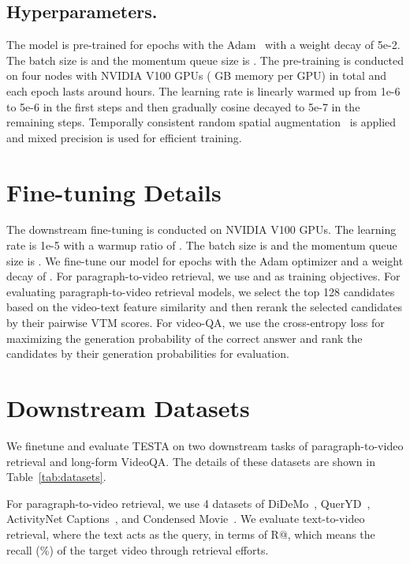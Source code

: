 \documentclass[11pt]{article}
\newcommand{\modelname}{TESTA\xspace}
\begin{document}
\subsection{Hyperparameters.}
The model is pre-trained for  epochs with the Adam~\citep{adam} with a weight decay of 5e-2.
The batch size is  and the momentum queue size is . 
The pre-training is conducted on four nodes with  NVIDIA V100 GPUs ( GB memory per GPU) in total and each epoch lasts around  hours.
The learning rate is linearly warmed up from 1e-6 to 5e-6 in the first  steps and then gradually cosine decayed to 5e-7 in the remaining steps.
Temporally consistent random spatial augmentation~\citep{qian2021spatiotemporal} is applied and mixed precision is used for efficient training.

\section{Fine-tuning Details}
\label{sec:fine-tuning}
The downstream fine-tuning is conducted on  NVIDIA V100 GPUs. The learning rate is 1e-5 with a warmup ratio of . The batch size is  and the momentum queue size is . We fine-tune our model for  epochs with the Adam optimizer and a weight decay of . 
For paragraph-to-video retrieval,  we use  and   as training objectives.  
For evaluating paragraph-to-video retrieval models, we select the top 128 candidates based on the video-text feature similarity and then rerank the selected candidates by their pairwise VTM scores.
For video-QA, we use the cross-entropy loss for maximizing the generation probability of the correct answer and rank the candidates by their generation probabilities for evaluation.

\section{Downstream Datasets}
\label{sec:dataset}
We finetune and evaluate \modelname on two downstream tasks of paragraph-to-video retrieval and long-form VideoQA. The details of these datasets are shown in Table~\ref{tab:datasets}. 

For paragraph-to-video retrieval, we use 4 datasets of DiDeMo~\citep{Hendricks2017LocalizingMI}, QuerYD~\citep{Oncescu2020QUERYDAV}, ActivityNet Captions~\citep{Krishna2017DenseCaptioningEI}, and Condensed Movie~\cite{Bain2020CondensedMS}.
We evaluate text-to-video retrieval, where the text acts as the query, in terms of R@, which means the recall (\%) of the target video through  retrieval efforts. 
\end{document}
